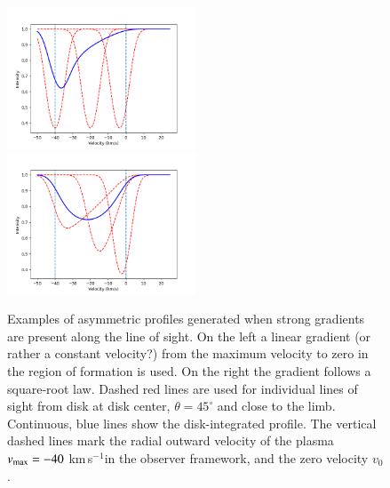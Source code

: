 \documentclass{/Users/art2/TeX/aanda/aa}
\def\kms {km\,s$^{-1}$}
\begin{document}
\begin{figure}
\includegraphics[width=0.5\textwidth]{Fig2a.png}
\includegraphics[width=0.5\textwidth]{Fig2b.png}
\caption{Examples of asymmetric profiles generated when strong gradients are present along the line of sight. 
On the left a linear gradient (or rather a constant velocity?) from the maximum velocity to zero in the region of formation is used. On the right the 
gradient follows a square-root law. Dashed red lines are used for individual lines of sight from disk at 
disk center, $\theta =45^{\circ}$ and close to the limb. Continuous, blue lines show the disk-integrated profile.  The vertical dashed 
lines mark the radial outward velocity of the plasma $v_{\rm{max}}=-40$ \kms in the observer framework, and the zero velocity $v_0$.}
\label{example}
\end{figure}
\end{document}
